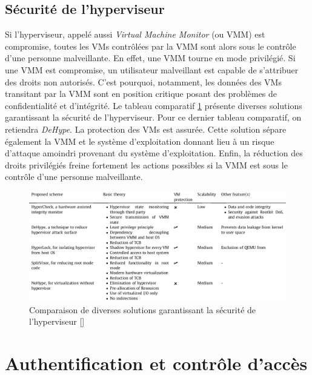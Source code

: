 \subsection{Sécurité de l'hyperviseur}
Si l'\gls{hyperviseur}, appelé aussi \textit{Virtual Machine Monitor} (ou VMM) est compromise, toutes les VMs contrôlées par la VMM sont alors sous le contrôle d'une personne malveillante. En effet, une VMM tourne en mode privilégié. Si une VMM est compromise, un utilisateur malveillant est capable de s'attribuer des droits non autorisés. C'est pourquoi, notamment, les données des VMs transitant par la VMM sont en position critique posant des problèmes de confidentialité et d'intégrité. Le tableau comparatif \ref{label-image15} présente diverses solutions garantissant la sécurité de l'hyperviseur. Pour ce dernier tableau comparatif, on retiendra \textit{DeHype}. La protection des VMs est assurée. Cette solution sépare également la VMM et le système d'exploitation donnant lieu à un risque d'attaque amoindri provenant du système d'exploitation. Enfin, la réduction des droits privilégiés freine fortement les actions possibles si la VMM est sous le contrôle d'une personne malveillante. 

\begin{figure}[h]
	\center
	\includegraphics[width=15.5cm]{./pics/VMM_solutions_tableau.png}
	\caption{Comparaison de diverses solutions garantissant la sécurité de l'hyperviseur [\cite{security_cloud_survey}]}
	\label{label-image15}
\end{figure}

\section{Authentification et contrôle d'accès}\label{sec:auth}

